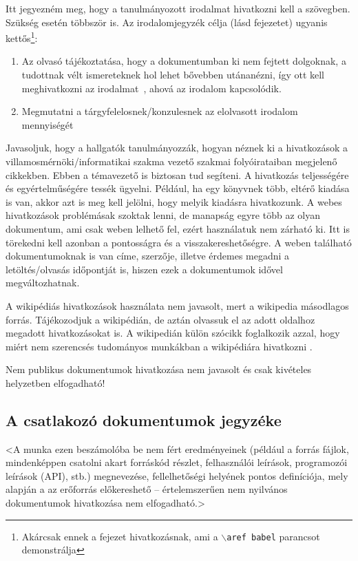 \documentclass[11pt,a4paper,oneside]{article}
\begin{document}
Itt jegyezném meg, hogy a tanulmányozott irodalmat hivatkozni kell a
szövegben.  Szükség esetén többször is.  Az irodalomjegyzék célja
(lásd fejezetet) ugyanis
kettős\footnote{Akárcsak ennek a fejezet hivatkozásnak, ami a
  \texttt{$\backslash$aref babel} parancsot demonstrálja}:
\begin{enumerate}
\item Az olvasó tájékoztatása, hogy a dokumentumban ki nem fejtett
  dolgoknak, a tudottnak vélt ismereteknek hol lehet bővebben
  utánanézni, így ott kell meghivatkozni az irodalmat~\cite{eco,
    esterhazy}, ahová az irodalom kapcsolódik.
\item Megmutatni a tárgyfelelosnek/konzulesnek az elolvasott irodalom
  mennyiségét
\end{enumerate}

Javasoljuk, hogy a hallgatók tanulmányozzák, hogyan néznek ki a
hivatkozások a villamosmérnöki/informatikai szakma vezető szakmai
folyóirataiban megjelenő cikkekben.  Ebben a témavezető is biztosan
tud segíteni.  A hivatkozás teljességére és egyértelműségére tessék
ügyelni.  Például, ha egy könyvnek több, eltérő kiadása is van, akkor
azt is meg kell jelölni, hogy melyik kiadásra hivatkozunk.  A webes
hivatkozások problémásak szoktak lenni, de manapság egyre több az
olyan dokumentum, ami csak weben lelhető fel, ezért használatuk nem
zárható ki. Itt is törekedni kell azonban a pontosságra és a
visszakereshetőségre. A weben található dokumentumoknak is van címe,
szerzője, illetve érdemes megadni a letöltés/olvasás időpontját is,
hiszen ezek a dokumentumok idővel megváltozhatnak.

A wikipédiás hivatkozások használata nem javasolt, mert a wikipedia
másodlagos forrás.  Tájékozodjuk a wikipédián, de aztán olvassuk el az
adott oldalhoz megadott hivatkozásokat is.  A wikipedián külön szócikk
foglalkozik azzal, hogy miért nem szerencsés tudományos munkákban a
wikipédiára hivatkozni \cite{wikipedia}.

Nem publikus dokumentumok hivatkozása nem javasolt és csak kivételes
helyzetben elfogadható!

\subsection{A csatlakozó dokumentumok jegyzéke}
\label{sec:csat-irod}

<A munka ezen beszámolóba be nem fért eredményeinek (például a forrás
fájlok, mindenképpen csatolni akart forráskód részlet, felhasználói
leírások, programozói leírások (API), stb.) megnevezése,
fellelhetőségi helyének pontos definíciója, mely alapján a az
erőforrás előkereshető -- értelemszerűen nem nyilvános dokumentumok
hivatkozása nem elfogadható.>
\end{document}
